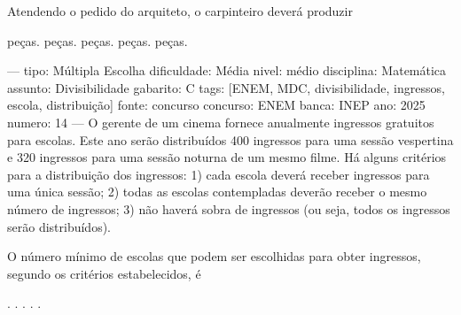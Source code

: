 Atendendo o pedido do arquiteto, o carpinteiro deverá produzir
\begin{choices}
 peças.
 peças.
 peças.
 peças.
 peças.
\end{choices}

---
tipo: Múltipla Escolha
dificuldade: Média
nivel: médio
disciplina: Matemática
assunto: Divisibilidade
gabarito: C
tags: [ENEM, MDC, divisibilidade, ingressos, escola, distribuição]
fonte: concurso
concurso: ENEM
banca: INEP
ano: 2025
numero: 14
---
\question
O gerente de um cinema fornece anualmente ingressos gratuitos para escolas. Este ano serão distribuídos 400 ingressos para uma sessão vespertina e 320 ingressos para uma sessão noturna de um mesmo filme. Há alguns critérios para a distribuição dos ingressos: 1) cada escola deverá receber ingressos para uma única sessão; 2) todas as escolas contempladas deverão receber o mesmo número de ingressos; 3) não haverá sobra de ingressos (ou seja, todos os ingressos serão distribuídos).

O número mínimo de escolas que podem ser escolhidas para obter ingressos, segundo os critérios estabelecidos, é
\begin{choices}
.
.
.
.
.
\end{choices}
